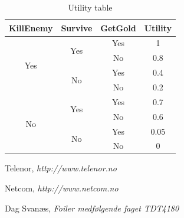 \documentclass[titlepage]{article}
\begin{document}
\begin{table}[H]
\centering
\begin{tabular}{ |c|c|c|c| }

\hline
KillEnemy & Survive & GetGold & Utility \\ \hline
\multirow{4}{*}{Yes} & \multirow{2}{*}{Yes} & Yes & 1 \\ \cline{3-4}
 & & No & 0.8 \\ \cline{2-4}
 & \multirow{2}{*}{No} & Yes & 0.4 \\ \cline{3-4}
 & & No & 0.2 \\ \hline

 \multirow{4}{*}{No} & \multirow{2}{*}{Yes} & Yes & 0.7 \\ \cline{3-4}
 & & No & 0.6 \\ \cline{2-4}
 & \multirow{2}{*}{No} & Yes & 0.05 \\ \cline{3-4}
 & & No & 0 \\ \hline
\end{tabular}
\caption{Utility table}
\end{table}


\begin{thebibliography}{9}

	Telenor,
	\emph{http://www.telenor.no}

	Netcom,
	\emph{http://www.netcom.no}

	Dag Svanæs,
	\emph{Foiler medfølgende faget TDT4180}
\end{thebibliography}
\end{document}
